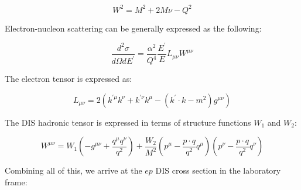 \begin{equation}
	W^2 = M^2 + 2M\nu - Q^2
\end{equation}

Electron-nucleon scattering can be generally expressed as the following:

\begin{equation}
	\frac{d^2\sigma}{d\Omega dE^\prime} = \frac{\alpha^2}{Q^4}\frac{E^\prime}{E} L_{\mu\nu}W^{\mu\nu}
\end{equation}


The electron tensor is expressed as:

%

\begin{equation}
	L_{\mu\nu} = 2\left(k^{\prime\mu}k^{\nu} + k^{\prime\nu}k^{\mu} - \left(k^{\prime}\cdot k - m^{2}\right)g^{\mu\nu}\right)
\end{equation}

The DIS hadronic tensor is expressed in terms of structure functions $W_1$ and $W_2$:

%

\begin{equation}
	W^{\mu\nu} = W_{1}\left(-g^{\mu\nu} + \frac{q^{\mu}q^{\nu}}{q^2}\right) + \frac{W_2}{M^2}\left(p^{\mu}-\frac{p\cdot q}{q^2}q^{\mu}\right)\left(p^{\nu}-\frac{p\cdot q}{q^2}q^{\nu}\right)
\end{equation}

Combining all of this, we arrive at the $ep$ DIS cross section in the laboratory frame:


